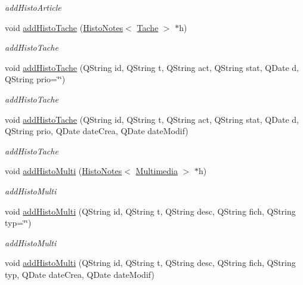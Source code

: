 \begin{DoxyCompactItemize}
\begin{DoxyCompactList}\small\item\em add\+Histo\+Article \end{DoxyCompactList}\item 
void \hyperlink{class_histo_note_manager_a38fc4d370cbb798a3bf0e27cb137dc04}{add\+Histo\+Tache} (\hyperlink{class_histo_notes}{Histo\+Notes}$<$ \hyperlink{class_tache}{Tache} $>$ $\ast$h)
\begin{DoxyCompactList}\small\item\em add\+Histo\+Tache \end{DoxyCompactList}\item 
void \hyperlink{class_histo_note_manager_aa39d4be652b36a11fc3eff4cd4185555}{add\+Histo\+Tache} (Q\+String id, Q\+String t, Q\+String act, Q\+String stat, Q\+Date d, Q\+String prio=\char`\"{}\char`\"{})
\begin{DoxyCompactList}\small\item\em add\+Histo\+Tache \end{DoxyCompactList}\item 
void \hyperlink{class_histo_note_manager_a8a9500441883ca6234661980f03f060c}{add\+Histo\+Tache} (Q\+String id, Q\+String t, Q\+String act, Q\+String stat, Q\+Date d, Q\+String prio, Q\+Date date\+Crea, Q\+Date date\+Modif)
\begin{DoxyCompactList}\small\item\em add\+Histo\+Tache \end{DoxyCompactList}\item 
void \hyperlink{class_histo_note_manager_a642ae43d25bcb4926d6f3fed9a44e87d}{add\+Histo\+Multi} (\hyperlink{class_histo_notes}{Histo\+Notes}$<$ \hyperlink{class_multimedia}{Multimedia} $>$ $\ast$h)
\begin{DoxyCompactList}\small\item\em add\+Histo\+Multi \end{DoxyCompactList}\item 
void \hyperlink{class_histo_note_manager_ab8efae5db8eac8ca891d87cea8719c52}{add\+Histo\+Multi} (Q\+String id, Q\+String t, Q\+String desc, Q\+String fich, Q\+String typ=\char`\"{}\char`\"{})
\begin{DoxyCompactList}\small\item\em add\+Histo\+Multi \end{DoxyCompactList}\item 
void \hyperlink{class_histo_note_manager_a1dfe21e0d7b157b704edfc511a93eeec}{add\+Histo\+Multi} (Q\+String id, Q\+String t, Q\+String desc, Q\+String fich, Q\+String typ, Q\+Date date\+Crea, Q\+Date date\+Modif)

\end{DoxyCompactItemize}
